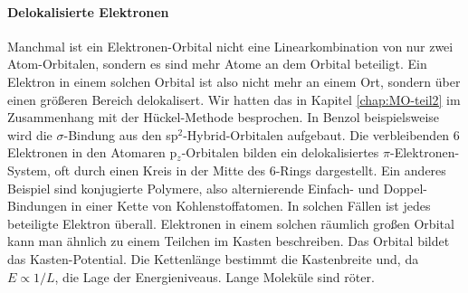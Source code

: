 \paragraph{Delokalisierte Elektronen} Manchmal ist ein Elektronen-Orbital nicht eine Linearkombination von nur zwei Atom-Orbitalen, sondern es sind mehr Atome an dem Orbital beteiligt. Ein Elektron in einem solchen Orbital ist also nicht mehr an einem Ort, sondern über einen größeren Bereich delokalisert. Wir hatten das in Kapitel  \ref{chap:MO-teil2} im Zusammenhang mit der Hückel-Methode besprochen. In Benzol beispielsweise wird die $\sigma$-Bindung aus den sp$^2$-Hybrid-Orbitalen aufgebaut. Die verbleibenden 6 Elektronen in den Atomaren p$_z$-Orbitalen bilden ein delokalisiertes $\pi$-Elektronen-System, oft durch einen Kreis in der Mitte des 6-Rings dargestellt. Ein anderes Beispiel sind konjugierte Polymere, also alternierende Einfach- und Doppel-Bindungen in einer Kette von Kohlenstoffatomen. In solchen Fällen ist jedes beteiligte Elektron überall. Elektronen in einem solchen räumlich großen Orbital kann man ähnlich zu einem Teilchen im Kasten beschreiben. Das Orbital bildet das Kasten-Potential. Die Kettenlänge bestimmt die Kastenbreite und, da $E \propto 1 /L$, die Lage der Energieniveaus. Lange Moleküle sind röter.

















\printbibliography[segment=\therefsegment,heading=subbibliography]

